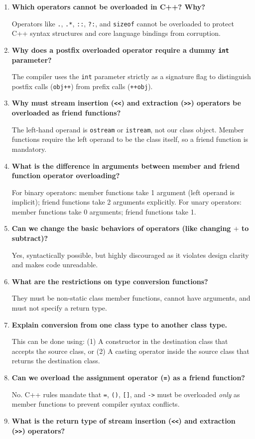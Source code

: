 \documentclass[12pt,a4paper]{article}
\newcommand{\Q}[1]{\textbf{#1}\par\noindent\ignorespaces}
\begin{document}
\begin{tcolorbox}[exambox, title={\textbf{Frequently Asked / Viva Questions}}]
\begin{enumerate}[topsep=0pt, label=\textbf{Q\arabic*.}, itemsep=5pt]
  \item \Q{Which operators cannot be overloaded in C++? Why?}
    Operators like \texttt{.}, \texttt{.*}, \texttt{::}, \texttt{?:}, and \texttt{sizeof} cannot be overloaded to protect C++ syntax structures and core language bindings from corruption.
  \item \Q{Why does a postfix overloaded operator require a dummy \texttt{int} parameter?}
    The compiler uses the \texttt{int} parameter strictly as a signature flag to distinguish postfix calls (\texttt{obj++}) from prefix calls (\texttt{++obj}).
  \item \Q{Why must stream insertion (\texttt{<<}) and extraction (\texttt{>>}) operators be overloaded as friend functions?}
    The left-hand operand is \texttt{ostream} or \texttt{istream}, not our class object. Member functions require the left operand to be the class itself, so a friend function is mandatory.
  \item \Q{What is the difference in arguments between member and friend function operator overloading?}
    For binary operators: member functions take 1 argument (left operand is implicit); friend functions take 2 arguments explicitly. For unary operators: member functions take 0 arguments; friend functions take 1.
  \item \Q{Can we change the basic behaviors of operators (like changing $+$ to subtract)?}
    Yes, syntactically possible, but highly discouraged as it violates design clarity and makes code unreadable.
  \item \Q{What are the restrictions on type conversion functions?}
    They must be non-static class member functions, cannot have arguments, and must not specify a return type.
  \item \Q{Explain conversion from one class type to another class type.}
    This can be done using: (1) A constructor in the destination class that accepts the source class, or (2) A casting operator inside the source class that returns the destination class.
  \item \Q{Can we overload the assignment operator (\texttt{=}) as a friend function?}
    No. C++ rules mandate that \texttt{=}, \texttt{()}, \texttt{[]}, and \texttt{->} must be overloaded \textit{only} as member functions to prevent compiler syntax conflicts.
  \item \Q{What is the return type of stream insertion (\texttt{<<}) and extraction (\texttt{>>}) operators?}

\end{enumerate}
\end{tcolorbox}
\end{document}
